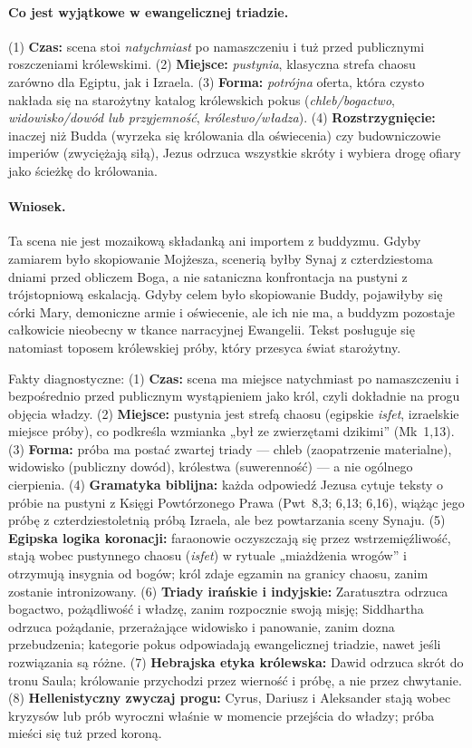 \paragraph*{Co jest wyjątkowe w ewangelicznej triadzie.}
(1) \textbf{Czas:} scena stoi \emph{natychmiast} po namaszczeniu i tuż przed publicznymi roszczeniami królewskimi.
(2) \textbf{Miejsce:} \emph{pustynia}, klasyczna strefa chaosu zarówno dla Egiptu, jak i Izraela.
(3) \textbf{Forma:} \emph{potrójna} oferta, która czysto nakłada się na starożytny katalog królewskich pokus (\emph{chleb/bogactwo}, \emph{widowisko/dowód lub przyjemność}, \emph{królestwo/władza}).
(4) \textbf{Rozstrzygnięcie:} inaczej niż Budda (wyrzeka się królowania dla oświecenia) czy budowniczowie imperiów (zwyciężają siłą), Jezus odrzuca wszystkie skróty i wybiera drogę ofiary jako ścieżkę do królowania.

\paragraph*{Wniosek.}
Ta scena nie jest mozaikową składanką ani importem z buddyzmu.
Gdyby zamiarem było skopiowanie Mojżesza, scenerią byłby Synaj z czterdziestoma dniami przed obliczem Boga, a nie sataniczna konfrontacja na pustyni z trójstopniową eskalacją.
Gdyby celem było skopiowanie Buddy, pojawiłyby się córki Mary, demoniczne armie i oświecenie, ale ich nie ma, a buddyzm pozostaje całkowicie nieobecny w tkance narracyjnej Ewangelii.
Tekst posługuje się natomiast toposem królewskiej próby, który przesyca świat starożytny.

Fakty diagnostyczne:
(1) \textbf{Czas:} scena ma miejsce natychmiast po namaszczeniu i bezpośrednio przed publicznym wystąpieniem jako król, czyli dokładnie na progu objęcia władzy.
(2) \textbf{Miejsce:} pustynia jest strefą chaosu (egipskie \emph{isfet}, izraelskie miejsce próby), co podkreśla wzmianka „był ze zwierzętami dzikimi” (Mk~1,13).
(3) \textbf{Forma:} próba ma postać zwartej triady — chleb (zaopatrzenie materialne), widowisko (publiczny dowód), królestwa (suwerenność) — a nie ogólnego cierpienia.
(4) \textbf{Gramatyka biblijna:} każda odpowiedź Jezusa cytuje teksty o próbie na pustyni z Księgi Powtórzonego Prawa (Pwt~8,3; 6,13; 6,16), wiążąc jego próbę z czterdziestoletnią próbą Izraela, ale bez powtarzania sceny Synaju.
(5) \textbf{Egipska logika koronacji:} faraonowie oczyszczają się przez wstrzemięźliwość, stają wobec pustynnego chaosu (\emph{isfet}) w rytuale „miażdżenia wrogów” i otrzymują insygnia od bogów; król zdaje egzamin na granicy chaosu, zanim zostanie intronizowany.
(6) \textbf{Triady irańskie i indyjskie:} Zaratusztra odrzuca bogactwo, pożądliwość i władzę, zanim rozpocznie swoją misję; Siddhartha odrzuca pożądanie, przerażające widowisko i panowanie, zanim dozna przebudzenia; kategorie pokus odpowiadają ewangelicznej triadzie, nawet jeśli rozwiązania są różne.
(7) \textbf{Hebrajska etyka królewska:} Dawid odrzuca skrót do tronu Saula; królowanie przychodzi przez wierność i próbę, a nie przez chwytanie.
(8) \textbf{Hellenistyczny zwyczaj progu:} Cyrus, Dariusz i Aleksander stają wobec kryzysów lub prób wyroczni właśnie w momencie przejścia do władzy; próba mieści się tuż przed koroną.

